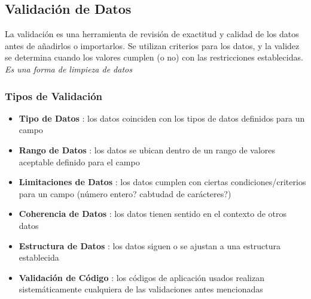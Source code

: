 \subsection{Validación de Datos}
La validación es una herramienta de revisión de exactitud y calidad de los datos antes de añadirlos o importarlos. Se utilizan criterios para los datos, y la validez se determina cuando los valores cumplen (o no) con las restricciones establecidas. \textit{Es una forma de limpieza de datos}

\subsubsection{Tipos de Validación}
\begin{itemize}
    \item {\textbf{Tipo de Datos} : los datos coinciden con los tipos de datos definidos para un campo}
    \item {\textbf{Rango de Datos} : los datos se ubican dentro de un rango de valores aceptable definido para el campo}
    \item {\textbf{Limitaciones de Datos} : los datos cumplen con ciertas condiciones/criterios para un campo (número entero? cabtudad de carácteres?)}
    \item {\textbf{Coherencia de Datos} : los datos tienen sentido en el contexto de otros datos}
    \item {\textbf{Estructura de Datos} : los datos siguen o se ajustan a una estructura establecida}
    \item {\textbf{Validación de Código} : los códigos de aplicación usados realizan sistemáticamente cualquiera de las validaciones antes mencionadas}
\end{itemize}

